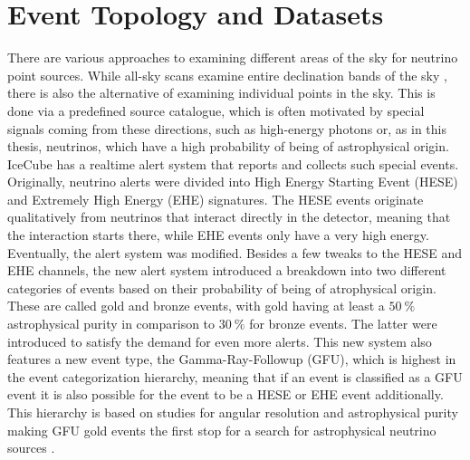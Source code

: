 \chapter{Event Topology and Datasets} \label{sec:events_data}

%

There are various approaches to examining different areas of the sky for neutrino point sources.
While all-sky scans examine entire declination bands of the sky \cite{some_all_sky_scan}, there is also the alternative of examining individual points in the sky.
This is done via a predefined source catalogue, which is often motivated by special signals coming from these directions, such as high-energy photons or, as in this thesis, neutrinos, which have a high probability of being of astrophysical origin.
IceCube has a realtime alert system that reports and collects such special events.
Originally, neutrino alerts were divided into High Energy Starting Event (HESE) and Extremely High Energy (EHE) signatures.
The HESE events originate qualitatively from neutrinos that interact directly in the detector, meaning that the interaction starts there, while EHE events only have a very high energy.
Eventually, the alert system was modified.
Besides a few tweaks to the HESE and EHE channels, the new alert system introduced a breakdown into two different categories of events based on their probability of being of atrophysical origin.
These are called gold and bronze events, with gold having at least a $\SI{50}{\percent}$ astrophysical purity in comparison to $\SI{30}{\percent}$ for bronze events.
The latter were introduced to satisfy the demand for even more alerts.
This new system also features a new event type, the Gamma-Ray-Followup (GFU), which is highest in the event categorization hierarchy, meaning that if an event is classified as a GFU event it is also possible for the event to be a HESE or EHE event additionally.
This hierarchy is based on studies for angular resolution and astrophysical purity making GFU gold events the first stop for a search for astrophysical neutrino sources \cite{Aartsen_2017}.

